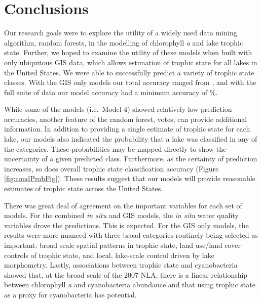 \documentclass[11pt,]{article}
\begin{document}
\section{Conclusions}\label{conclusions}

Our research goals were to explore the utility of a widely used data
mining algorithm, random forests, in the modelling of chlorophyll
\emph{a} and lake trophic state. Further, we hoped to examine the
utility of these models when built with only ubiquitous GIS data, which
allows estimation of trophic state for all lakes in the United States.
We were able to successfully predict a variety of trophic state classes.
With the GIS only models our total accuracy ranged from , and with the
full suite of data our model accuracy had a minimum accuracy of \%.

While some of the models (i.e.~Model 4) showed relatively low prediction
accuracies, another feature of the random forest, votes, can provide
additional information. In addition to providing a single estimate of
trophic state for each lake, our models also indicated the probability
that a lake was classified in any of the categories. These probabilities
may be mapped directly to show the uncertainty of a given predicted
class. Furthermore, as the certainty of prediction increases, so does
overall trophic state classification accuracy (Figure
\ref{fig:condProbFig}). These results suggest that our models will
provide reasonable estimates of trophic state across the United States.

There was great deal of agreement on the important variables for each
set of models. For the combined \emph{in situ} and GIS models, the
\emph{in situ} water quality variables drove the predictions. This is
expected. For the GIS only models, the results were more nuanced with
three broad categories routinely being selected as important: broad
scale spatial patterns in trophic state, land use/land cover controls of
trophic state, and local, lake-scale control driven by lake morphometry.
Lastly, associations between trophic state and cyanobacteria showed
that, at the broad scale of the 2007 NLA, there is a linear relationship
between chlorophyll \emph{a} and cyanobacteria abundance and that using
trophic state as a proxy for cyanobacteria has potential.
\end{document}
